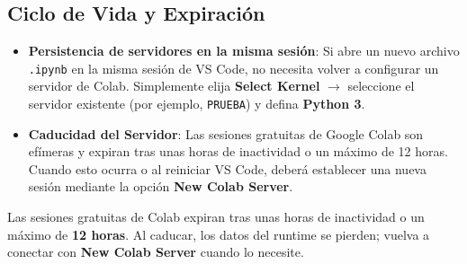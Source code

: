 \documentclass[11pt,a4paper]{article}
\begin{document}
\subsection{Ciclo de Vida y Expiración}
\begin{itemize}
    \item \textbf{Persistencia de servidores en la misma sesión}: Si abre un nuevo archivo \texttt{.ipynb} en la misma sesión de VS Code, no necesita volver a configurar un servidor de Colab. Simplemente elija \textbf{Select Kernel} $\rightarrow$ seleccione el servidor existente (por ejemplo, \texttt{PRUEBA}) y defina \textbf{Python 3}.
    \item \textbf{Caducidad del Servidor}: Las sesiones gratuitas de Google Colab son efímeras y expiran tras unas horas de inactividad o un máximo de 12 horas. Cuando esto ocurra o al reiniciar VS Code, deberá establecer una nueva sesión mediante la opción \textbf{New Colab Server}.
\end{itemize}

\begin{cajaRecuerda}
Las sesiones gratuitas de Colab expiran tras unas horas de inactividad o un máximo de \textbf{12 horas}. Al caducar, los datos del runtime se pierden; vuelva a conectar con \textbf{New Colab Server} cuando lo necesite.
\end{cajaRecuerda}
\end{document}
